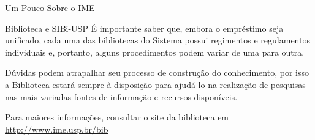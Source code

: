 \begin{secao}{Um Pouco Sobre o IME}
\begin{subsecao}{Biblioteca e SIBi-USP}
É importante saber que, embora o empréstimo seja unificado, cada uma das bibliotecas do
Sistema possui regimentos e regulamentos individuais e, portanto, alguns procedimentos
podem variar de uma para outra.

Dúvidas podem atrapalhar seu processo de construção do conhecimento, por isso a Biblioteca
estará sempre à disposição para ajudá-lo na realização de pesquisas nas mais variadas fontes
de informação e recursos disponíveis.

Para maiores informações, consultar o site da biblioteca em
\url{http://www.ime.usp.br/bib}

\end{subsecao}
\end{secao}
